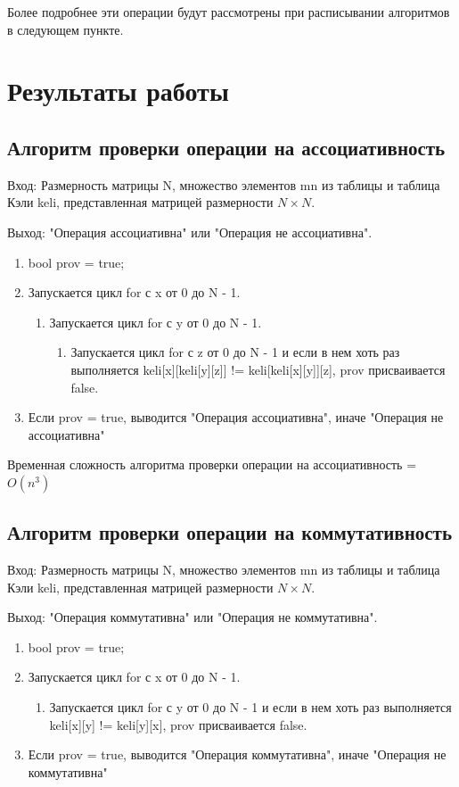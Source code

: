 \documentclass[bachelor, och, labwork]{shiza}
\begin{document}
	Более подробнее эти операции будут рассмотрены при расписывании алгоритмов в следующем пункте.
	\section{Результаты работы}
	
	\subsection{Алгоритм проверки операции на ассоциативность}
	
	$\textit{Вход:}$ Размерность матрицы N, множество элементов mn из таблицы и таблица Кэли keli, представленная матрицей размерности $N \times N$.
	
	$\textit{Выход:}$  "Операция ассоциативна" или "Операция не ассоциативна".
	
	\begin{enumerate} 
		\item bool prov = true;
		\item Запускается цикл for с x от 0 до N - 1.
		\begin{enumerate} 
			\item Запускается цикл for с y от 0 до N - 1.
			\begin{enumerate} 
				\item Запускается цикл for с z от 0 до N - 1 и если в нем хоть раз выполняется keli[x][keli[y][z]] != keli[keli[x][y]][z], prov присваивается false.
			\end{enumerate} 
		\end{enumerate}
		\item Если prov = true, выводится "Операция ассоциативна", иначе "Операция не ассоциативна"
	\end{enumerate} 
	
	Временная сложность алгоритма проверки операции на ассоциативность = $O(n^3)$
	
	\subsection{Алгоритм проверки операции на коммутативность}
	
	$\textit{Вход:}$ Размерность матрицы N, множество элементов mn из таблицы и таблица Кэли keli, представленная матрицей размерности $N \times N$.
	
	$\textit{Выход:}$  "Операция коммутативна" или "Операция не коммутативна".
	
	\begin{enumerate} 
		\item bool prov = true;
		\item Запускается цикл for с x от 0 до N - 1.
		\begin{enumerate} 
			\item Запускается цикл for с y от 0 до N - 1 и если в нем хоть раз выполняется keli[x][y] != keli[y][x], prov присваивается false.
		\end{enumerate}
		\item Если prov = true, выводится "Операция коммутативна", иначе "Операция не коммутативна"
	\end{enumerate} 
	
\end{document}
